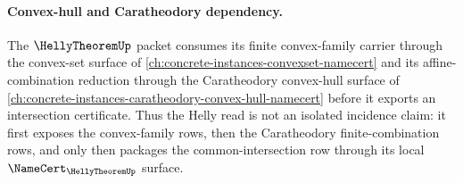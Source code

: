 \paragraph{Convex-hull and Caratheodory dependency.}
The $\HellyTheoremUp$ packet consumes its finite convex-family carrier through the convex-set surface of \autoref{ch:concrete-instances-convexset-namecert} and its affine-combination reduction through the Caratheodory convex-hull surface of \autoref{ch:concrete-instances-caratheodory-convex-hull-namecert} before it exports an intersection certificate. Thus the Helly read is not an isolated incidence claim: it first exposes the convex-family rows, then the Caratheodory finite-combination rows, and only then packages the common-intersection row through its local $\NameCert_{\HellyTheoremUp}$ surface.
